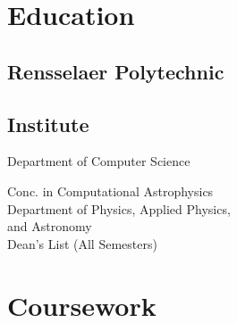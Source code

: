 \documentclass[letterpaper]{deedy-resume} %
\begin{document}

\lastupdated %



\begin{minipage}[t]{0.33\textwidth} %


\section{Education} 

\subsection{Rensselaer Polytechnic}
\subsection{Institute}

Department of Computer Science\\

Conc. in Computational Astrophysics \\
Department of Physics, Applied Physics,\\
and Astronomy\\
Dean's List (All Semesters) \\


\section{Coursework}


\end{minipage}
\end{document}
